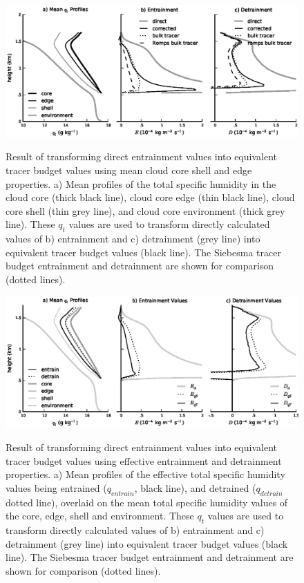 \documentclass[12pt]{article}
\begin{document}
\begin{figure}[t]
  \noindent
  \includegraphics[width=39pc,angle=0]{./figures/shell_correction}\\
  \caption{Result of transforming direct entrainment values into equivalent 
  tracer budget values using mean cloud core shell and edge properties.  
  a) Mean profiles of the total specific humidity in the cloud core (thick 
  black line), cloud core edge (thin black line), cloud core shell (thin 
  grey line), and cloud core environment (thick grey line).  These $q_t$ 
  values are used to transform directly calculated values of b) entrainment 
  and c) detrainment (grey line) into equivalent tracer budget values 
  (black line).  The Siebesma tracer budget entrainment and detrainment
  are shown for comparison (dotted lines).}
  \label{fig:Shell_correction}
\end{figure}

\begin{figure}[t]
  \noindent
  \includegraphics[width=39pc,angle=0]{./figures/reynolds_correction}\\
  \caption{Result of transforming direct entrainment values into equivalent 
  tracer budget values using effective entrainment and detrainment properties.
  a) Mean profiles of the effective total specific humidity values being
  entrained ($q_{entrain}$, black line), and detrained ($q_{detrain}$ dotted
  line), overlaid on the mean total specific humidity values of the core, edge, 
  shell and environment.  These $q_t$ values are used to transform directly 
  calculated values of b) entrainment and c) detrainment (grey line) into 
  equivalent tracer budget values (black line).  The Siebesma tracer 
  budget entrainment and detrainment are shown for comparison (dotted lines).}
  \label{fig:Reynolds_correction}
\end{figure}
\end{document}
